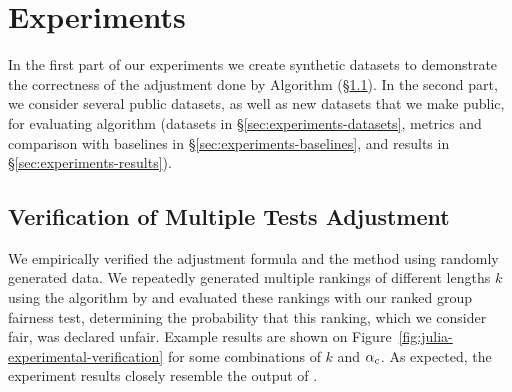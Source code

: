 \section{Experiments}\label{sec:experiments}
In the first part of our experiments we create synthetic datasets to demonstrate the correctness of the adjustment done by Algorithm \algoCorrect (\S\ref{subsubsec:JuliaExperimentalVerification}).
%
In the second part, we consider several public datasets, as well as new datasets that we make public, for evaluating algorithm \algoFAIR (datasets in \S\ref{sec:experiments-datasets}, metrics and comparison with baselines in \S\ref{sec:experiments-baselines}, and results in \S\ref{sec:experiments-results}).

\subsection{Verification of Multiple Tests Adjustment}
\label{subsubsec:JuliaExperimentalVerification}

We empirically verified the adjustment formula and the \algoCorrect method using randomly generated data.
%
We repeatedly generated multiple rankings of different lengths $k$ using the algorithm by \citet{yang2016measuring} and evaluated these rankings with our ranked group fairness test, determining the probability that this ranking, which we consider fair, was declared unfair.
%
Example results are shown on Figure~\ref{fig:julia-experimental-verification} for some combinations of $k$ and $\alpha_c$.
%
As expected, the experiment results closely resemble the output of \algoCorrect.

